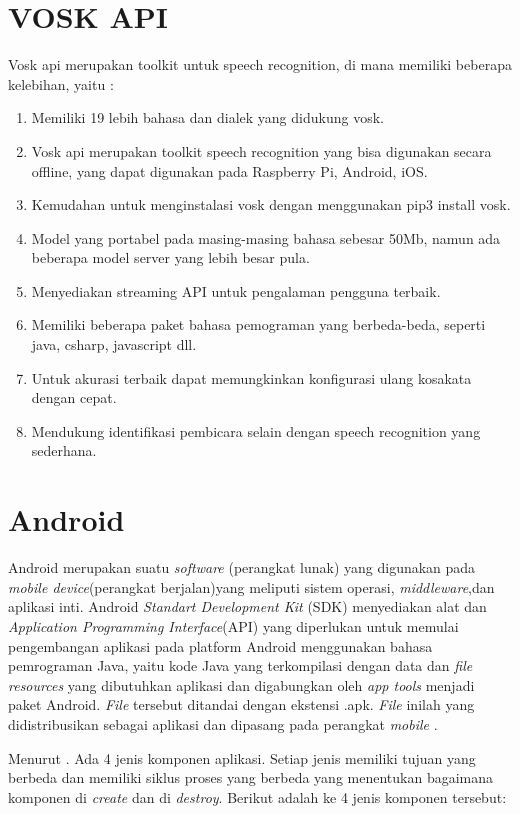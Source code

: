 \section{VOSK API}
Vosk api merupakan toolkit untuk speech recognition, di mana memiliki beberapa kelebihan, yaitu \citep{cephei2019}:
\begin{enumerate}
\item Memiliki 19 lebih bahasa dan dialek yang didukung vosk.
\item Vosk api merupakan toolkit speech recognition yang bisa digunakan secara offline, yang dapat digunakan pada Raspberry Pi, Android, iOS.
\item Kemudahan untuk menginstalasi vosk dengan menggunakan pip3 install vosk.
\item Model yang portabel pada masing-masing bahasa sebesar 50Mb, namun ada beberapa model server yang lebih besar pula.
\item Menyediakan streaming API untuk pengalaman pengguna terbaik.
\item Memiliki beberapa paket bahasa pemograman yang berbeda-beda, seperti java, csharp, javascript dll.
\item Untuk akurasi terbaik dapat memungkinkan konfigurasi ulang kosakata dengan cepat.
\item Mendukung identifikasi pembicara selain dengan speech recognition yang sederhana.

\end{enumerate}

\section{Android}
Android merupakan suatu \textit{software} (perangkat lunak) yang digunakan pada \textit{mobile device}(perangkat berjalan)yang meliputi sistem operasi, \textit{middleware},dan aplikasi inti. Android \textit{Standart Development Kit} (SDK) menyediakan alat dan \textit{Application Programming Interface}(API) yang diperlukan untuk memulai pengembangan aplikasi pada platform Android menggunakan bahasa pemrograman Java, yaitu kode Java yang terkompilasi dengan data dan \textit{file resources} yang dibutuhkan aplikasi dan digabungkan oleh \textit{app tools} menjadi paket Android. \textit{File} tersebut ditandai dengan ekstensi .apk. \textit{File} inilah yang didistribusikan sebagai aplikasi dan dipasang pada perangkat \textit{mobile} \citep{nasution2018perancangan}.

\par Menurut \citep{shaheen2017android}. Ada 4 jenis komponen aplikasi. Setiap jenis memiliki tujuan yang berbeda dan memiliki siklus proses yang berbeda yang menentukan bagaimana komponen di \textit{create} dan di \textit{destroy}. Berikut adalah ke 4 jenis komponen tersebut:

